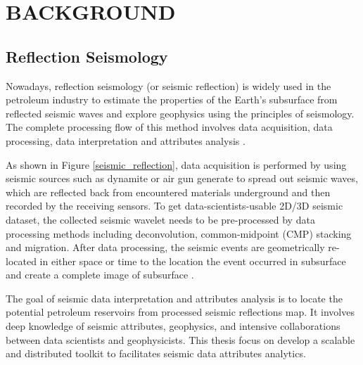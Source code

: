 %
%
%

\chapter{\uppercase{Background}}

\section{Reflection Seismology}

Nowadays, reflection seismology (or seismic reflection) is widely used in the petroleum industry to estimate the properties of the Earth's subsurface from reflected seismic waves and explore geophysics using the principles of seismology. The complete processing flow of this method involves data acquisition, data processing, data interpretation and attributes analysis \cite{seisreflectionwiki}. 

As shown in Figure \ref{seismic_reflection}, data acquisition is performed by using seismic sources such as dynamite or air gun generate to spread out seismic waves, which are reflected back from encountered materials underground and then recorded by the receiving sensors. To get data-scientists-usable 2D/3D seismic dataset, the collected seismic wavelet needs to be pre-processed by data processing methods including deconvolution, common-midpoint (CMP) stacking and migration. After data processing, the seismic events are geometrically re-located in either space or time to the location the event occurred in subsurface and create a complete image of subsurface \cite{seisreflectionwiki}. 

The goal of seismic data interpretation and  attributes analysis is to locate the potential petroleum reservoirs from processed seismic reflections map. It involves deep knowledge of seismic attributes, geophysics, and intensive collaborations between data scientists and geophysicists. This thesis focus on develop a scalable and distributed toolkit to facilitates seismic data attributes analytics.   

